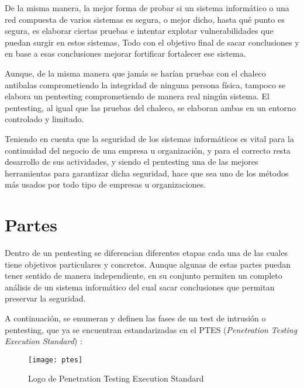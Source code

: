 De la misma manera, la mejor forma de probar si un sistema informático o una red compuesta de varios sistemas es segura, o mejor dicho, hasta qué punto es segura, es elaborar ciertas pruebas e intentar explotar vulnerabilidades que puedan surgir en estos sistemas, Todo con el objetivo final de sacar conclusiones y en base a esas conclusiones mejorar fortificar fortalecer ese sistema.

Aunque, de la misma manera que jamás se harían pruebas con el chaleco antibalas comprometiendo la integridad de ninguna persona física, tampoco se elabora un pentesting comprometiendo de manera real ningún sistema. El pentesting, al igual que las pruebas del chaleco, se elaboran ambas en un entorno controlado y limitado.

Teniendo en cuenta que la seguridad de los sistemas informáticos es vital para la continuidad del negocio de una empresa u organización, y para el correcto resta desarrollo de sus actividades, y siendo el pentesting una de las mejores herramientas para garantizar dicha seguridad, hace que sea uno de los métodos más usados por todo tipo de empresas u organizaciones.



\section{Partes}

Dentro de un pentesting se diferencian diferentes etapas cada una de las cuales tiene objetivos particulares y concretos. Aunque algunas de estas partes puedan tener sentido de manera independiente, en su conjunto permiten un completo análisis de un sistema informático del cual sacar conclusiones que permitan preservar la seguridad.

A continuación, se enumeran y definen las fases de un test de intrusión o pentesting, que ya se encuentran estandarizadas en el PTES (\textit{Penetration Testing Execution Standard}) \cite{ptes}:

\begin{figure}[H]
	\centering
	\texttt{[image: ptes]}
	\caption{Logo de Penetration Testing Execution Standard}
	\label{fig:ptes}
\end{figure}

